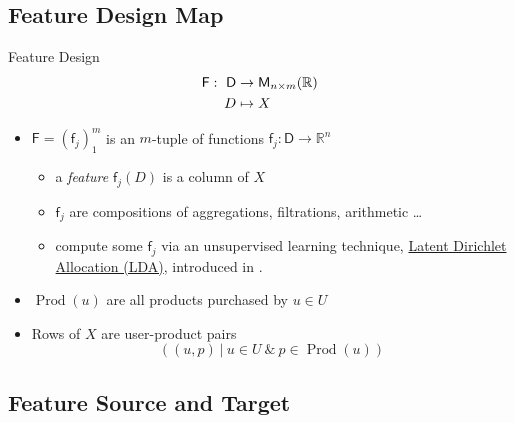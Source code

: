 \documentclass[handout]{beamer}
\begin{document}
\subsection{Feature Design Map}


\begin{frame}
 
\begin{block}{Feature Design}
\begin{equation*}\label{eq:feature-design}
\setlength\abovedisplayskip{0pt}
\begin{split}
  \mathsf{F}  :  \ \mathsf{D} &\rightarrow \mathsf{M}_{n\times m} (\mathbb{R}) \\
         D &\mapsto X
\end{split}
\end{equation*}
\end{block}
\vfill
\begin{itemize}
 \item \(\mathsf{F} = (\mathsf{f}_j )_{1}^m\) is an \(m\)-tuple of functions
 \( \mathsf{f}_j : \mathsf{D} \rightarrow \mathbb{R}^n \)
\vfill
\begin{itemize}
\item a \emph{feature} \( \mathsf{f}_j (D) \) is a %
column of \(X\)
\vfill
\item \(\mathsf{f}_j\) are compositions of aggregations,
filtrations, arithmetic \ldots
\vfill
\item compute some \(\mathsf{f}_j\) via an
unsupervised learning technique,
\href{https://en.wikipedia.org/wiki/Latent_Dirichlet_allocation}{Latent
Dirichlet Allocation (LDA)}, introduced in
\cite{bleiLatentDirichletAllocation2003}.
\end{itemize}
\vfill
\item \(\mathop{Prod} (u)\) are all products purchased by \(u \in U\)
\vfill
\item Rows of \(X\) are user-product pairs
\begin{equation*}
\left( (u, p) \ | \ u \in U \ \& \ p \in \mathop{{Prod}} (u) \right)
\end{equation*}
\end{itemize}

\end{frame}


\subsection{Feature Source and Target}
\end{document}
